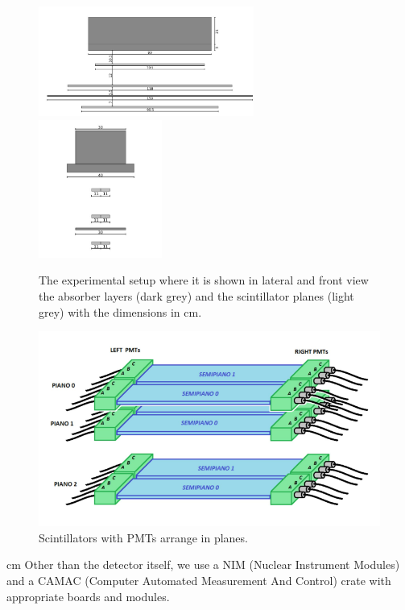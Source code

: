 	\begin{figure}
		\centering
		\includegraphics[width=0.63\textwidth]{figures/11.png}
		\includegraphics[width=0.36\textwidth]{figures/22.png}
		\caption{The experimental setup where it is shown in lateral and front view the absorber layers (dark grey) and the scintillator planes (light grey) with the dimensions in cm.}
		\label{fig:Scintillators_Detectors}
	\end{figure}
	\begin{figure}
		\centering
		\includegraphics[width=1\textwidth]{figures/33.png}
		\caption{Scintillators with PMTs arrange in planes.}
		\label{fig:Setup}
	\end{figure}
	 cm
	Other than the detector itself, we use a NIM (Nuclear Instrument Modules) and a 
    CAMAC (Computer Automated Measurement And Control) crate with appropriate boards and modules.
